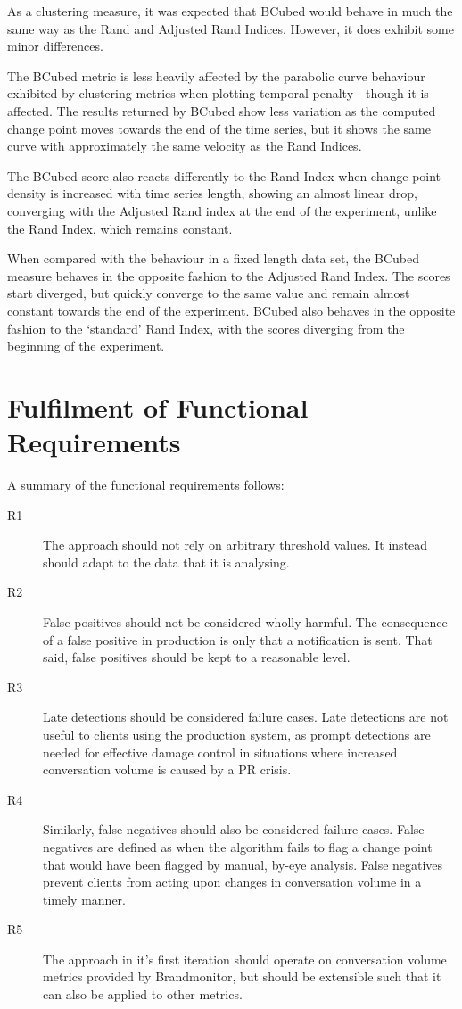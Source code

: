 \documentclass[../main.tex]{subfiles}
\begin{document}
As a clustering measure, it was expected that BCubed would behave in much the same way as the Rand and Adjusted Rand Indices. However, it does exhibit some minor differences.

The BCubed metric is less heavily affected by the parabolic curve behaviour exhibited by clustering metrics when plotting temporal penalty - though it is affected. The results returned by BCubed show less variation as the computed change point moves towards the end of the time series, but it shows the same curve with approximately the same velocity as the Rand Indices.

The BCubed score also reacts differently to the Rand Index when change point density is increased with time series length, showing an almost linear drop, converging with the Adjusted Rand index at the end of the experiment, unlike the Rand Index, which remains constant.

When compared with the behaviour in a fixed length data set, the BCubed measure behaves in the opposite fashion to the Adjusted Rand Index. The scores start diverged, but quickly converge to the same value and remain almost constant towards the end of the experiment. BCubed also behaves in the opposite fashion to the `standard' Rand Index, with the scores diverging from the beginning of the experiment.

\section{Fulfilment of Functional Requirements}
\label{requirements fulfilment}

A summary of the functional requirements follows:

\begin{description}
    \item[R1] The approach should not rely on arbitrary threshold values. It instead should adapt to the data that it is analysing.
    \item[R2] False positives should not be considered wholly harmful. The consequence of a false positive in production is only that a notification is sent. That said, false positives should be kept to a reasonable level.
    \item[R3] Late detections should be considered failure cases. Late detections are not useful to clients using the production system, as prompt detections are needed for effective damage control in situations where increased conversation volume is caused by a PR crisis.
    \item[R4] Similarly, false negatives should also be considered failure cases. False negatives are defined as when the algorithm fails to flag a change point that would have been flagged by manual, by-eye analysis. False negatives prevent clients from acting upon changes in conversation volume in a timely manner.
    \item[R5] The approach in it's first iteration should operate on conversation volume metrics provided by Brandmonitor, but should be extensible such that it can also be applied to other metrics.
\end{description}
\end{document}
